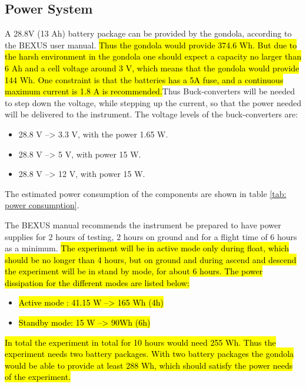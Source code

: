\pagebreak
\subsection{Power System}

\label{sec:4.7}

A 28.8V (13 Ah) battery package can be provided by the gondola, according to the BEXUS user manual. \hl{Thus the gondola would provide 374.6 Wh. But due to the harsh environment in the gondola one should expect a capacity no larger than 6 Ah and a cell voltage around 3 V, which means that the gondola would provide 144 Wh. One constraint is that the batteries has a 5A fuse, and a continuous maximum current is 1.8 A is recommended.}Thus Buck-converters will be needed to step down the voltage, while stepping up the current, so that the power needed will be delivered to the instrument. The voltage levels of the buck-converters are:

\begin{itemize}
	\item 28.8 V --> 3.3 V, with the power 1.65 W.
	\item 28.8 V --> 5 V, with power 15 W.
	\item 28.8 V --> 12 V, with power 15 W.
\end{itemize}


The estimated power consumption of the components are shown in table \ref{tab: power consumption}.




The BEXUS manual recommends the instrument be prepared to have power supplies for 2 hours of testing, 2 hours on ground and for a flight time of 6 hours as a minimum. \hl{The experiment will be in active mode only during float, which should be no longer than 4 hours, but on ground and during ascend and descend the experiment will be in stand by mode, for about 6 hours. The power dissipation for the different modes are listed below:}


\begin{itemize}
    \item \hl{Active mode : 41.15 W --> 165 Wh (4h) }
    \item \hl{Standby mode: 15 W --> 90Wh (6h)}
\end{itemize}

\hl{In total the experiment in total for 10 hours would need 255 Wh. Thus the experiment needs two battery packages. With two battery packages the gondola would be able to provide at least 288 Wh, which should satisfy the power needs of the experiment. }



\raggedbottom
